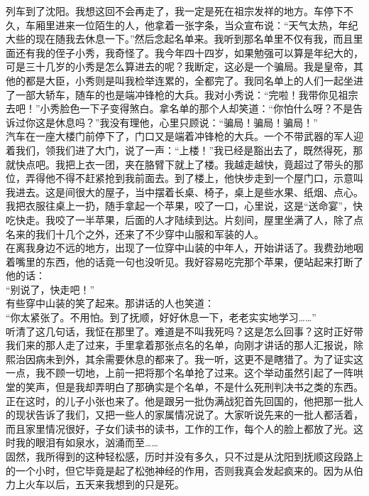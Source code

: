 列车到了沈阳。我想这回不会再走了，我一定是死在祖宗发祥的地方。车停下不久，车厢里进来一位陌生的人，他拿着一张字条，当众宣布说：“天气太热，年纪大些的现在随我去休息一下。”然后念起名单来。我听到那名单里不仅有我，而且里面还有我的侄子小秀，我奇怪了。我今年四十四岁，如果勉强可以算是年纪大的，可是三十几岁的小秀是怎么算进去的呢？我断定，这必是一个骗局。我是皇帝，其他的都是大臣，小秀则是叫我检举连累的，全都完了。我同名单上的人们一起坐进了一部大轿车，随车的也是端冲锋枪的大兵。我对小秀说：“完啦！我带你见祖宗去吧！”小秀脸色一下子变得煞白。拿名单的那个人却笑道：“你怕什么呀？不是告诉过你这是休息吗？”我没有理他，心里只顾说：“骗局！骗局！骗局！”\\

汽车在一座大楼门前停下了，门口又是端着冲锋枪的大兵。一个不带武器的军人迎着我们，领我们进了大门，说了一声：“上楼！”我已经是豁出去了，既然得死，那就快点吧。我把上衣一团，夹在胳臂下就上了楼。我越走越快，竟超过了带头的那位，弄得他不得不赶紧抢到我前面去。到了楼上，他快步走到一个屋门口，示意叫我进去。这是间很大的屋子，当中摆着长桌、椅子，桌上是些水果、纸烟、点心。我把衣服往桌上一扔，随手拿起一个苹果，咬了一口，心里说，这是“送命宴”，快吃快走。我咬了一半苹果，后面的人才陆续到达。片刻间，屋里坐满了人，除了点名来的我们十几个之外，还来了不少穿中山服和军装的人。\\

在离我身边不远的地方，出现了一位穿中山装的中年人，开始讲话了。我费劲地咽着嘴里的东西，他的话竟一句也没听见。我好容易吃完那个苹果，便站起来打断了他的话：\\

“别说了，快走吧！”\\

有些穿中山装的笑了起来。那讲话的人也笑道：\\

“你太紧张了。不用怕。到了抚顺，好好休息一下，老老实实地学习……”\\

听清了这几句话，我怔在那里了。难道是不叫我死吗？这是怎么回事？这时正好带我们来的那人走了过来，手里拿着那张点名的名单，向刚才讲话的那人汇报说，除熙治因病未到外，其余需要休息的都来了。我一听，这更不是瞎猎了。为了证实这一点，我不顾一切地，上前一把将那个名单抢了过来。这个举动虽然引起了一阵哄堂的笑声，但是我却弄明白了那确实是个名单，不是什么死刑判决书之类的东西。正在这时，的儿子小张也来了。他是跟另一批伪满战犯首先回国的，他把那一批人的现状告诉了我们，又把一些人的家属情况说了。大家听说先来的一批人都活着，而且家里情况很好，子女们读书的读书，工作的工作，每个人的脸上都放了光。这时我的眼泪有如泉水，汹涌而至……\\

固然，我所得到的这种轻松感，历时并没有多久，只不过是从沈阳到抚顺这段路上的一个小时，但它毕竟是起了松弛神经的作用，否则我真会发起疯来的。因为从伯力上火车以后，五天来我想到的只是死。
